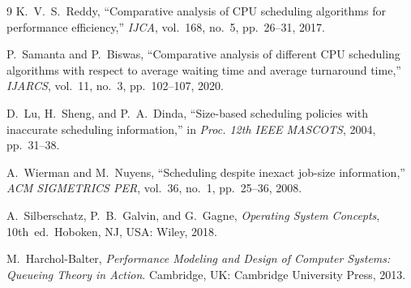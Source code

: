 \documentclass[11pt]{article}
\begin{document}
\vspace{0.6em}
\begin{thebibliography}{9}
\footnotesize
\setlength{\itemsep}{-0.45em}
\setlength{\parsep}{0pt}
K.~V.~S.~Reddy, ``Comparative analysis of CPU scheduling algorithms for performance efficiency,'' \textit{IJCA}, vol.~168, no.~5, pp.~26--31, 2017.

P.~Samanta and P.~Biswas, ``Comparative analysis of different CPU scheduling algorithms with respect to average waiting time and average turnaround time,'' \textit{IJARCS}, vol.~11, no.~3, pp.~102--107, 2020.

D.~Lu, H.~Sheng, and P.~A.~Dinda, ``Size-based scheduling policies with inaccurate scheduling information,'' in \textit{Proc. 12th IEEE MASCOTS}, 2004, pp.~31--38.

A.~Wierman and M.~Nuyens, ``Scheduling despite inexact job-size information,'' \textit{ACM SIGMETRICS PER}, vol.~36, no.~1, pp.~25--36, 2008.

A.~Silberschatz, P.~B.~Galvin, and G.~Gagne, \textit{Operating System Concepts}, 10th~ed.\ Hoboken, NJ, USA: Wiley, 2018.

M.~Harchol-Balter, \textit{Performance Modeling and Design of Computer Systems: Queueing Theory in Action}. Cambridge, UK: Cambridge University Press, 2013.

\end{thebibliography}
\end{document}
